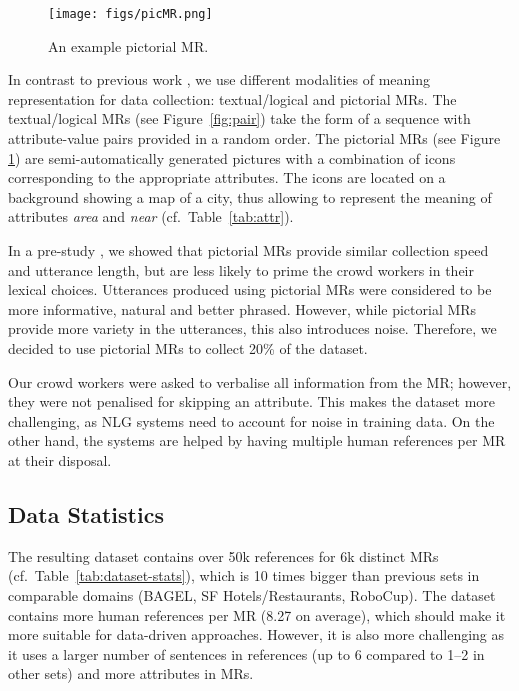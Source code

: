 \documentclass[11pt,a4paper]{article}
\begin{document}
\begin{figure}[t]
\begin{center}
\texttt{[image: figs/picMR.png]}
\end{center}
\caption{An example pictorial MR.}
\label{fig:picture}
\end{figure}

In contrast to previous work \cite{mairesse:acl2010,wen_stochastic_2015,dusek_context-aware_2016}, we use different modalities of meaning representation for data collection: textual/logical and pictorial MRs. 
The textual/logical MRs (see Figure~\ref{fig:pair}) take the form of a sequence with attribute-value pairs provided in a random order. 
The pictorial MRs (see Figure \ref{fig:picture}) are semi-automatically generated pictures with a combination of icons corresponding to the appropriate attributes. The icons are located on a background showing a map of a city, thus allowing to represent the meaning of attributes \emph{area} and \emph{near} (cf.~Table~\ref{tab:attr}).

In a pre-study \cite{novikova:INLG2016}, we showed that pictorial MRs provide similar collection speed and utterance length, but are less likely to prime the crowd workers in their lexical choices. Utterances produced using pictorial MRs were considered to be more informative, natural and better phrased.
However, while pictorial MRs provide more variety in the utterances, this also introduces noise.
Therefore, we decided to use pictorial MRs to collect 20\% of the dataset.

Our crowd workers  were asked to verbalise all information from the MR; however, they were not penalised for skipping an attribute.
This makes the dataset more challenging, as NLG systems 
need to account for noise in training data. 
On the other hand, the systems are helped by having multiple human references per MR at their disposal.

\subsection{Data Statistics} 


The resulting dataset \cite{novikova_e2e_2017} contains over 50k references for 6k distinct MRs (cf.\ Table~\ref{tab:dataset-stats}), which is 10 times bigger than previous sets in comparable domains (BAGEL, SF Hotels/Restaurants, RoboCup). The dataset contains more human references per MR (8.27 on average), which should make it more suitable for data-driven approaches. 
However, it is also more challenging as it uses a larger number of sentences in references (up to 6 compared to 1--2 in other sets) and more attributes in MRs.
\end{document}
